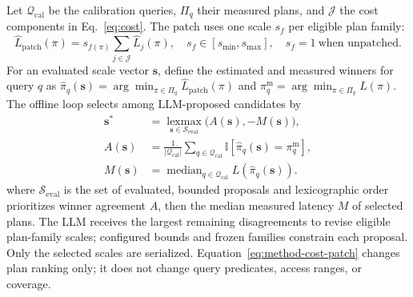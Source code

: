 Let $\mathcal{Q}_{\mathrm{cal}}$ be the calibration queries, $\Pi_q$ their measured plans, and $\mathcal{J}$ the cost components in Eq.~\eqref{eq:cost}. The patch uses one scale $s_f$ per eligible plan family:
\begin{equation}\label{eq:method-cost-patch}
\widehat{L}_{\mathrm{patch}}(\pi)
=s_{f(\pi)}\sum_{j\in\mathcal{J}}\widehat{L}_{j}(\pi),
\quad s_f\in[s_{\min},s_{\max}],
\quad s_f=1\ \text{when unpatched}.
\end{equation}
For an evaluated scale vector $\mathbf{s}$, define the estimated and measured winners for query $q$ as $\hat{\pi}_q(\mathbf{s})=\arg\min_{\pi\in\Pi_q}\widehat{L}_{\mathrm{patch}}(\pi)$ and $\pi_q^{\mathrm{m}}=\arg\min_{\pi\in\Pi_q}L(\pi)$. The offline loop selects among LLM-proposed candidates by
\begin{equation}\label{eq:method-calibration-objective}
\begin{aligned}
\mathbf{s}^{*}&=\operatorname*{lexmax}_{\mathbf{s}\in\mathcal{S}_{\mathrm{eval}}}
                  \bigl(A(\mathbf{s}),-M(\mathbf{s})\bigr),\\
A(\mathbf{s})&=\frac{1}{|\mathcal{Q}_{\mathrm{cal}}|}
  \sum_{q\in\mathcal{Q}_{\mathrm{cal}}}\mathbb{I}[\hat{\pi}_q(\mathbf{s})=\pi_q^{\mathrm{m}}],\\
M(\mathbf{s})&=\operatorname{median}_{q\in\mathcal{Q}_{\mathrm{cal}}}
  L(\hat{\pi}_q(\mathbf{s})).
\end{aligned}
\end{equation}
where $\mathcal{S}_{\mathrm{eval}}$ is the set of evaluated, bounded proposals and lexicographic order prioritizes winner agreement $A$, then the median measured latency $M$ of selected plans. The LLM receives the largest remaining disagreements to revise eligible plan-family scales; configured bounds and frozen families constrain each proposal. Only the selected scales are serialized. Equation~\eqref{eq:method-cost-patch} changes plan ranking only; it does not change query predicates, access ranges, or coverage.

